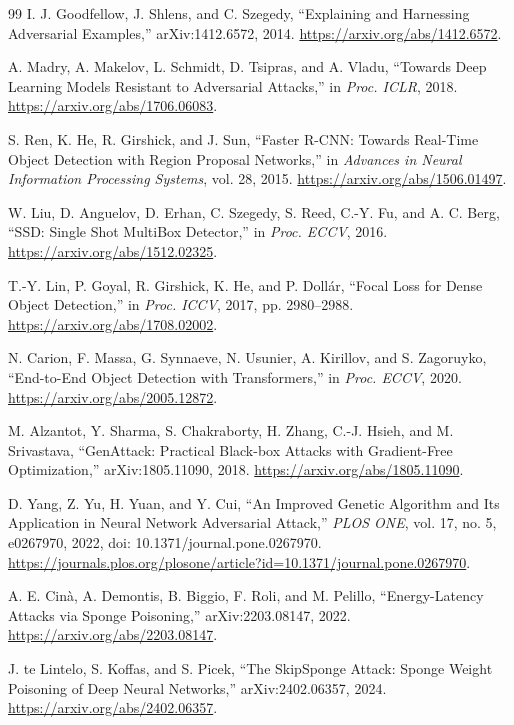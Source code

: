 \documentclass[a4paper,fleqn]{cas-dc}
\begin{document}
\begin{thebibliography}{99}
I. J. Goodfellow, J. Shlens, and C. Szegedy, ``Explaining and Harnessing Adversarial Examples,'' arXiv:1412.6572, 2014. \url{https://arxiv.org/abs/1412.6572}.

A. Madry, A. Makelov, L. Schmidt, D. Tsipras, and A. Vladu, ``Towards Deep Learning Models Resistant to Adversarial Attacks,'' in \emph{Proc. ICLR}, 2018. \url{https://arxiv.org/abs/1706.06083}.

S. Ren, K. He, R. Girshick, and J. Sun, ``Faster R-CNN: Towards Real-Time Object Detection with Region Proposal Networks,'' in \emph{Advances in Neural Information Processing Systems}, vol. 28, 2015. \url{https://arxiv.org/abs/1506.01497}.

W. Liu, D. Anguelov, D. Erhan, C. Szegedy, S. Reed, C.-Y. Fu, and A. C. Berg, ``SSD: Single Shot MultiBox Detector,'' in \emph{Proc. ECCV}, 2016. \url{https://arxiv.org/abs/1512.02325}.

T.-Y. Lin, P. Goyal, R. Girshick, K. He, and P. Dollár, ``Focal Loss for Dense Object Detection,'' in \emph{Proc. ICCV}, 2017, pp. 2980--2988. \url{https://arxiv.org/abs/1708.02002}.

N. Carion, F. Massa, G. Synnaeve, N. Usunier, A. Kirillov, and S. Zagoruyko, ``End-to-End Object Detection with Transformers,'' in \emph{Proc. ECCV}, 2020. \url{https://arxiv.org/abs/2005.12872}.

M. Alzantot, Y. Sharma, S. Chakraborty, H. Zhang, C.-J. Hsieh, and M. Srivastava, ``GenAttack: Practical Black-box Attacks with Gradient-Free Optimization,'' arXiv:1805.11090, 2018. \url{https://arxiv.org/abs/1805.11090}.

D. Yang, Z. Yu, H. Yuan, and Y. Cui, ``An Improved Genetic Algorithm and Its Application in Neural Network Adversarial Attack,'' \emph{PLOS ONE}, vol. 17, no. 5, e0267970, 2022, doi: 10.1371/journal.pone.0267970. \url{https://journals.plos.org/plosone/article?id=10.1371/journal.pone.0267970}.

A. E. Cinà, A. Demontis, B. Biggio, F. Roli, and M. Pelillo, ``Energy-Latency Attacks via Sponge Poisoning,'' arXiv:2203.08147, 2022. \url{https://arxiv.org/abs/2203.08147}.

J. te Lintelo, S. Koffas, and S. Picek, ``The SkipSponge Attack: Sponge Weight Poisoning of Deep Neural Networks,'' arXiv:2402.06357, 2024. \url{https://arxiv.org/abs/2402.06357}.


\end{thebibliography}
\end{document}
